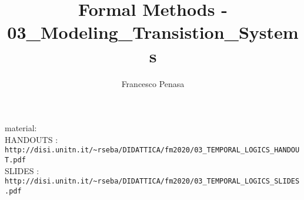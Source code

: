 \documentclass[11pt]{article}
\begin{document}
\author{Francesco Penasa}
\title{Formal Methods - 03\_Modeling\_Transistion\_Systems}
\maketitle

\medskip

material: 
\\
HANDOUTS : \texttt{http://disi.unitn.it/\~{}rseba/DIDATTICA/fm2020/03\_TEMPORAL\_LOGICS\_HANDOUT.pdf}
\\
SLIDES : \texttt{http://disi.unitn.it/\~{}rseba/DIDATTICA/fm2020/03\_TEMPORAL\_LOGICS\_SLIDES.pdf}
\\



\end{document}
